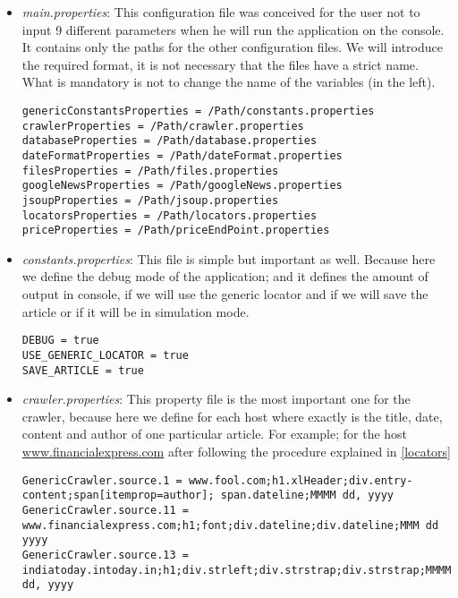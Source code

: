 \begin{itemize}
	\item \emph{main.properties}\label{main.properties}: This configuration file was conceived for the user not to input 9 different parameters when he will run the application on the console. It contains only the paths for the other configuration files. We will introduce the required format, it is not necessary that the files have a strict name. What is mandatory is not to change the name of the variables (in the left).
	
\begin{lstlisting}
genericConstantsProperties = /Path/constants.properties
crawlerProperties = /Path/crawler.properties
databaseProperties = /Path/database.properties
dateFormatProperties = /Path/dateFormat.properties
filesProperties = /Path/files.properties
googleNewsProperties = /Path/googleNews.properties
jsoupProperties = /Path/jsoup.properties
locatorsProperties = /Path/locators.properties
priceProperties = /Path/priceEndPoint.properties
\end{lstlisting}
	
	\item \emph{constants.properties}:  This file is simple but important as well. Because here we define the debug mode of the application; and it defines the amount of output in console, if we will use the generic locator and if we will save the article or if it will be in simulation mode.
	
\begin{lstlisting}
DEBUG = true
USE_GENERIC_LOCATOR = true
SAVE_ARTICLE = true
\end{lstlisting}
	
	\item \emph{crawler.properties}\label{crawlerProperties}: This property file is the most important one for the crawler, because here we define for each host where exactly is the title, date, content and author of one particular article. For example; for the host \url{www.financialexpress.com} after following the procedure explained in \ref{locators}

\begin{lstlisting}
GenericCrawler.source.1 = www.fool.com;h1.xlHeader;div.entry-content;span[itemprop=author]; span.dateline;MMMM dd, yyyy
GenericCrawler.source.11 = www.financialexpress.com;h1;font;div.dateline;div.dateline;MMM dd yyyy
GenericCrawler.source.13 = indiatoday.intoday.in;h1;div.strleft;div.strstrap;div.strstrap;MMMM dd, yyyy
\end{lstlisting}	


\end{itemize}
